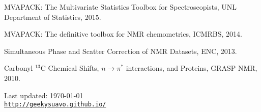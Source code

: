\documentclass[letterpaper]{article}
\def\footerlink{http://geekysuavo.github.io/}
\renewenvironment{itemize}{
  \begin{list}{}{
    \setlength{\leftmargin}{1.5em}
  }
}{
  \end{list}
}
\begin{document}
\begin{itemize}
\item MVAPACK: The Multivariate Statistics Toolbox for Spectroscopists,
  UNL Department of Statistics, 2015.
\end{itemize}

\begin{itemize}
\item MVAPACK: The definitive toolbox for NMR chemometrics, ICMRBS, 2014.
\end{itemize}

\begin{itemize}
\item Simultaneous Phase and Scatter Correction of NMR Datasets, ENC, 2013.
\end{itemize}

\begin{itemize}
\item Carbonyl $^{13}$C Chemical Shifts, $n\rightarrow\pi^*$ interactions,
  and Proteins, GRASP NMR, 2010.
\end{itemize}

\bigskip

\begin{center}
  \begin{footnotesize}
    Last updated: \today \\
    \href{\footerlink}{\texttt{\footerlink}}
  \end{footnotesize}
\end{center}

\end{document}
